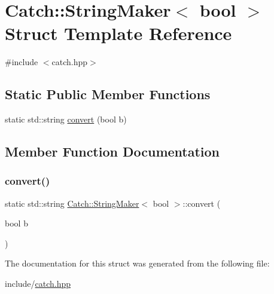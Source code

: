 \hypertarget{struct_catch_1_1_string_maker_3_01bool_01_4}{}\section{Catch\+::String\+Maker$<$ bool $>$ Struct Template Reference}
\label{struct_catch_1_1_string_maker_3_01bool_01_4}


{\ttfamily \#include $<$catch.\+hpp$>$}

\subsection*{Static Public Member Functions}
\begin{DoxyCompactItemize}
\item 
static std\+::string \mbox{\hyperlink{struct_catch_1_1_string_maker_3_01bool_01_4_a37e9899c82c4b4515f876f16f8957a77}{convert}} (bool b)
\end{DoxyCompactItemize}


\subsection{Member Function Documentation}
\mbox{\label{struct_catch_1_1_string_maker_3_01bool_01_4_a37e9899c82c4b4515f876f16f8957a77}} 
\subsubsection{\texorpdfstring{convert()}{convert()}}
{\footnotesize\ttfamily static std\+::string \mbox{\hyperlink{struct_catch_1_1_string_maker}{Catch\+::\+String\+Maker}}$<$ bool $>$\+::convert (\begin{DoxyParamCaption}\item[{bool}]{b }\end{DoxyParamCaption})\hspace{0.3cm}{\ttfamily [static]}}



The documentation for this struct was generated from the following file\+:\begin{DoxyCompactItemize}
\item 
include/\mbox{\hyperlink{catch_8hpp}{catch.\+hpp}}\end{DoxyCompactItemize}
